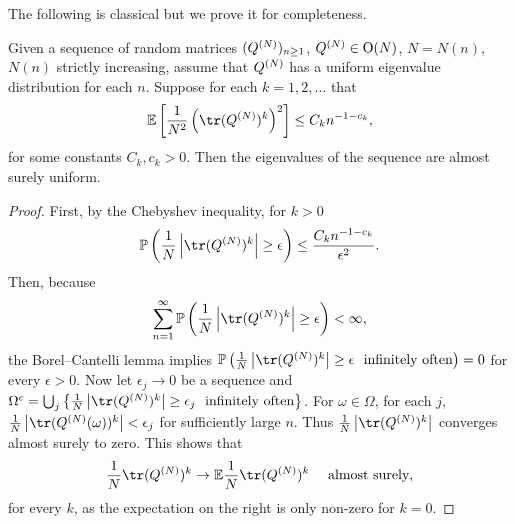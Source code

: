 The following is classical but we prove it for completeness.

\begin{theorem}\label{t:var}
Given a sequence of random matrices $(Q^{(N)})_{n \geq 1}$, $Q^{(N)} \in \mathrm O(N)$, $N = N(n)$, $N(n)$ strictly increasing, assume that $Q ^{(N)}$ has a uniform eigenvalue distribution for each $n$.  Suppose for each $k=1,2,\ldots$ that
\begin{align}
\mathbb E \left[ \frac{1}{N^2}\left( \tr (Q^{(N)})^k \right)^2 \right] \leq C_k n^{-1-c_k},
\end{align}
for some constants $C_k,c_k > 0$.  Then the eigenvalues of the sequence are almost surely uniform.
\end{theorem}

\begin{proof}
First, by the Chebyshev inequality, for $k > 0$
\begin{align}
\mathbb P\left( \frac{1}{N}\left| \tr (Q^{(N)})^k \right| \geq \epsilon \right) \leq \frac{C_k n^{-1-c_k}}{\epsilon^2}.
\end{align}
Then, because
\begin{align}
\sum_{n = 1}^\infty \mathbb P\left( \frac{1}{N}\left| \tr (Q^{(N)})^k \right| \geq \epsilon \right) < \infty,
\end{align}
the Borel--Cantelli lemma implies $\mathbb P \left( \frac{1}{N}\left| \tr (Q^{(N)})^k \right| \geq \epsilon  ~ \text{ infinitely often} \right) = 0$ for every $\epsilon > 0$.  Now let $\epsilon_j \to 0$ be a sequence and $\Omega^c = \bigcup_j \left\{ \frac{1}{N}\left| \tr (Q^{(N)})^k \right| \geq \epsilon_j  ~ \text{ infinitely often} \right\}$.  For $\omega \in \Omega$, for each $j$, $\frac{1}{N}\left| \tr (Q^{(N)}(\omega))^k \right| < \epsilon_j$ for sufficiently large $n$.  Thus $\frac{1}{N}\left| \tr (Q^{(N)})^k \right|$ converges almost surely to zero.  This shows that
\begin{align}
  \frac{1}{N} \tr (Q^{(N)})^k \to  \mathbb E \frac{1}{N} \tr (Q^{(N)})^k~~~\text{ almost surely},
\end{align}
for every $k$, as the expectation on the right is only non-zero for $k = 0$.  


\end{proof}
